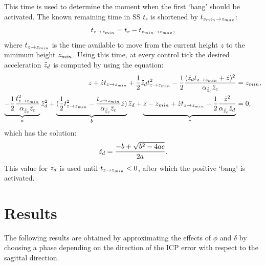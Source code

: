 This time is used to determine the moment when the first `bang' should be activated. The known remaining time in \ac{SS} $t_{r}$ is shortened by $ t_{z_{min} \rightarrow z_{max}}$:
\begin{equation}
	t_{z \rightarrow z_{min}} =t_{r} - t_{z_{min} \rightarrow z_{max}},
\end{equation}
where $t_{z \rightarrow z_{min}} $ is the time available to move from the current height $z$ to the minimum height $z_{min}$. Using this time, at every control tick the desired acceleration $\ddot{z}_d$ is computed by using the equation:
\begin{align}
	z + \dot{z}t_{z \rightarrow z_{min}} + \frac{1}{2}\ddot{z}_d t_{z \rightarrow z_{min}}^2 - \frac{1}{2}\frac{(\ddot{z}_d t_{z \rightarrow z_{min}} + \dot{z})^2}{\alpha_{\hat{\ddot{z}}_{c}} \ddot{z}_{c}} &= z_{min}, \\
	\underbrace{-\frac{1}{2}\frac{t_{z \rightarrow z_{min}}^2}{\alpha_{\hat{\ddot{z}}_{c}} \ddot{z}_{c}}}_a \ddot{z}_d^2 + \underbrace{(\frac{1}{2}t_{z \rightarrow z_{min}}^2-\frac{t_{z \rightarrow z_{min}}}{\alpha_{\hat{\ddot{z}}_{c}} \ddot{z}_{c}} \dot{z})}_b \ddot{z}_d + \underbrace{z -z_{min} +\dot{z}t_{z \rightarrow z_{min}} -\frac{1}{2}\frac{\dot{z}^2}{\alpha_{\hat{\ddot{z}}_{c}} \ddot{z}_d}}_c&=0,
\end{align}
which has the solution:
\begin{equation}
 	\ddot{z}_d = \frac{-b + \sqrt{b^2-4ac}}{2a}.
\end{equation}
This value for $\ddot{z}_d$ is used until $t_{z \rightarrow z_{min}}<0$, after which the positive `bang' is activated. 

\section{Results}
The following results are obtained by approximating the effects of $\phi$ and $\delta$ by choosing a phase depending on the direction of the \ac{ICP} error with respect to the sagittal direction.

